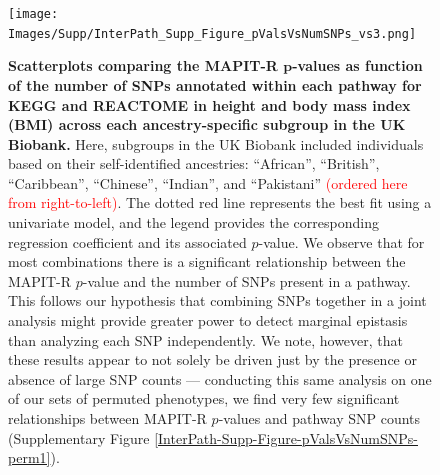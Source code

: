 \documentclass[10pt]{article}
\begin{document}
\begin{landscape}
\begin{figure}[htbp]
\centering
\vspace*{-2.2cm}
\texttt{[image: Images/Supp/InterPath\_Supp\_Figure\_pValsVsNumSNPs\_vs3.png]}
\caption{\textbf{Scatterplots comparing the MAPIT-R $\bm{p}$-values as function of the number of SNPs annotated within each pathway for KEGG and REACTOME in height and body mass index (BMI) across each ancestry-specific subgroup in the UK Biobank.} Here, subgroups in the UK Biobank included individuals based on their self-identified ancestries: ``African'', ``British'', ``Caribbean'', ``Chinese'', ``Indian'', and ``Pakistani'' \textcolor{red}{(ordered here from right-to-left)}. The dotted red line represents the best fit using a univariate model, and the legend provides the corresponding regression coefficient and its associated $p$-value. We observe that for most combinations there is a significant relationship between the MAPIT-R $p$-value and the number of SNPs present in a pathway. This follows our hypothesis that combining SNPs together in a joint analysis might provide greater power to detect marginal epistasis than analyzing each SNP independently. We note, however, that these results appear to not solely be driven just by the presence or absence of large SNP counts --- conducting this same analysis on one of our sets of permuted phenotypes, we find very few significant relationships between MAPIT-R $p$-values and pathway SNP counts (Supplementary Figure \ref{InterPath-Supp-Figure-pValsVsNumSNPs-perm1}).}
\label{InterPath-Supp-Figure-pValsVsNumSNPs}
\end{figure}
\clearpage
\end{landscape}

\end{document}
